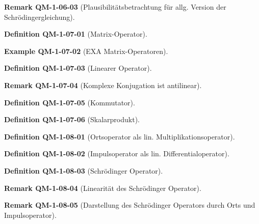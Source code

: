 \documentclass[10pt, letterpaper]{article}
\newcommand{\CustomHeading}[3]{%
  \par\medskip\noindent%
  \textbf{#1 #2} \textnormal{(#3)}.\enskip%
}
\newenvironment{DEF}[2]{\CustomHeading{Definition}{#1}{#2}}{}
\newenvironment{REM}[2]{\CustomHeading{Remark}{#1}{#2}}{}
\newenvironment{EXA}[2]{\CustomHeading{Example}{#1}{#2}}{}
\begin{document}
\begin{REM}{QM-1-06-03}{Plausibilitätsbetrachtung für allg. Version der Schrödingergleichung}
\end{REM}

\begin{DEF}{QM-1-07-01}{Matrix-Operator}
\end{DEF}

\begin{EXA}{QM-1-07-02}{EXA Matrix-Operatoren}
\end{EXA}

\begin{DEF}{QM-1-07-03}{Linearer Operator}
\end{DEF}

\begin{REM}{QM-1-07-04}{Komplexe Konjugation ist antilinear}
\end{REM}

\begin{DEF}{QM-1-07-05}{Kommutator}
\end{DEF}

\begin{DEF}{QM-1-07-06}{Skalarprodukt}
\end{DEF}

\begin{DEF}{QM-1-08-01}{Ortsoperator als lin. Multiplikationsoperator}
\end{DEF}

\begin{DEF}{QM-1-08-02}{Impulsoperator als lin. Differentialoperator}
\end{DEF}

\begin{DEF}{QM-1-08-03}{Schrödinger Operator}
\end{DEF}

\begin{REM}{QM-1-08-04}{Linearität des Schrödinger Operator}
\end{REM}

\begin{REM}{QM-1-08-05}{Darstellung des Schrödinger Operators durch Orts und Impulsoperator}
\end{REM}
\end{document}
